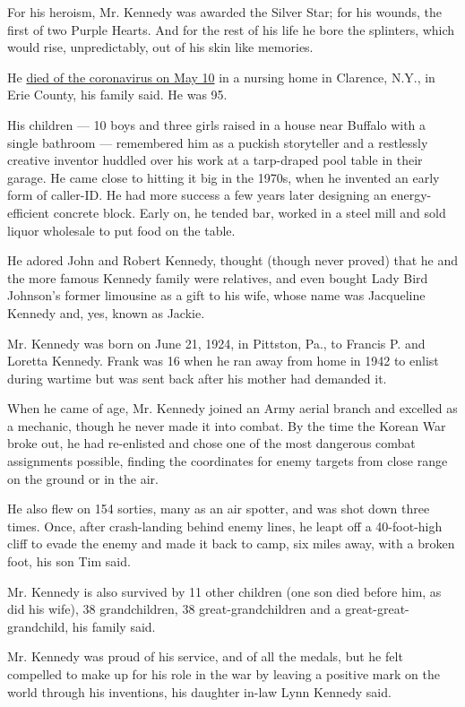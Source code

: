 For his heroism, Mr. Kennedy was awarded the Silver Star; for his
wounds, the first of two Purple Hearts. And for the rest of his life he
bore the splinters, which would rise, unpredictably, out of his skin
like memories.

He
\href{https://www.amigone.com/obituaries/obituary-listings?obId=13012751}{died
of the coronavirus on May 10} in a nursing home in Clarence, N.Y., in
Erie County, his family said. He was 95.

His children --- 10 boys and three girls raised in a house near Buffalo
with a single bathroom --- remembered him as a puckish storyteller and a
restlessly creative inventor huddled over his work at a tarp-draped pool
table in their garage. He came close to hitting it big in the 1970s,
when he invented an early form of caller-ID. He had more success a few
years later designing an energy-efficient concrete block. Early on, he
tended bar, worked in a steel mill and sold liquor wholesale to put food
on the table.

He adored John and Robert Kennedy, thought (though never proved) that he
and the more famous Kennedy family were relatives, and even bought Lady
Bird Johnson's former limousine as a gift to his wife, whose name was
Jacqueline Kennedy and, yes, known as Jackie.

Mr. Kennedy was born on June 21, 1924, in Pittston, Pa., to Francis P.
and Loretta Kennedy. Frank was 16 when he ran away from home in 1942 to
enlist during wartime but was sent back after his mother had demanded
it.

When he came of age, Mr. Kennedy joined an Army aerial branch and
excelled as a mechanic, though he never made it into combat. By the time
the Korean War broke out, he had re-enlisted and chose one of the most
dangerous combat assignments possible, finding the coordinates for enemy
targets from close range on the ground or in the air.

He also flew on 154 sorties, many as an air spotter, and was shot down
three times. Once, after crash-landing behind enemy lines, he leapt off
a 40-foot-high cliff to evade the enemy and made it back to camp, six
miles away, with a broken foot, his son Tim said.

Mr. Kennedy is also survived by 11 other children (one son died before
him, as did his wife), 38 grandchildren, 38 great-grandchildren and a
great-great-grandchild, his family said.

Mr. Kennedy was proud of his service, and of all the medals, but he felt
compelled to make up for his role in the war by leaving a positive mark
on the world through his inventions, his daughter in-law Lynn Kennedy
said.

